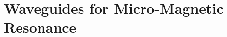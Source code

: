 \documentclass[]{book}
\title{}
\author{}
\begin{document}
	
	\chapter{Waveguides for Micro-Magnetic Resonance}
	
	
	
	
	
	
	
	
	
\end{document}
